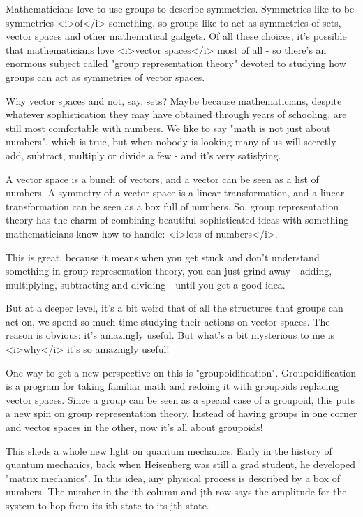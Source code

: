


Mathematicians love to use groups to describe symmetries.  Symmetries
like to be symmetries <i>of</i> something, so groups like to act as
symmetries of sets, vector spaces and other mathematical gadgets.  Of
all these choices, it's possible that mathematicians love <i>vector
spaces</i> most of all - so there's an enormous subject called
"group representation theory" devoted to studying how groups
can act as symmetries of vector spaces.

Why vector spaces and not, say, sets?  Maybe because mathematicians, 
despite whatever sophistication they may have obtained through years 
of schooling, are still most comfortable with numbers.  We like to say 
"math is not just about numbers", which is true, but when nobody is 
looking many of us will secretly add, subtract, multiply or divide a 
few - and it's very satisfying.  

A vector space is a bunch of vectors, and a vector can be seen as a list 
of numbers.  A symmetry of a vector space is a linear transformation, 
and a linear transformation can be seen as a box full of numbers.  
So, group representation theory has the charm of combining beautiful
sophisticated ideas with something mathematicians know how to handle: 
<i>lots of numbers</i>.

This is great, because it means when you get stuck and don't understand 
something in group representation theory, you can just grind away - 
adding, multiplying, subtracting and dividing - until you get a good 
idea.  

But at a deeper level, it's a bit weird that of all the structures
that groups can act on, we spend so much time studying their actions
on vector spaces.  The reason is obvious: it's amazingly useful.  But
what's a bit mysterious to me is <i>why</i> it's so amazingly useful!

One way to get a new perspective on this is "groupoidification".
Groupoidification is a program for taking familiar math and 
redoing it with groupoids replacing vector spaces.  Since a group
can be seen as a special case of a groupoid, this puts a new spin
on group representation theory.  Instead of having groups in one
corner and vector spaces in the other, now it's all about groupoids!

This sheds a whole new light on quantum mechanics.  Early in the
history of quantum mechanics, back when Heisenberg was still
a grad student, he developed "matrix mechanics".  In this idea,
any physical process is described by a box of numbers.  The 
number in the ith column and jth row says the amplitude 
for the system to hop from its ith state to its jth state.  

